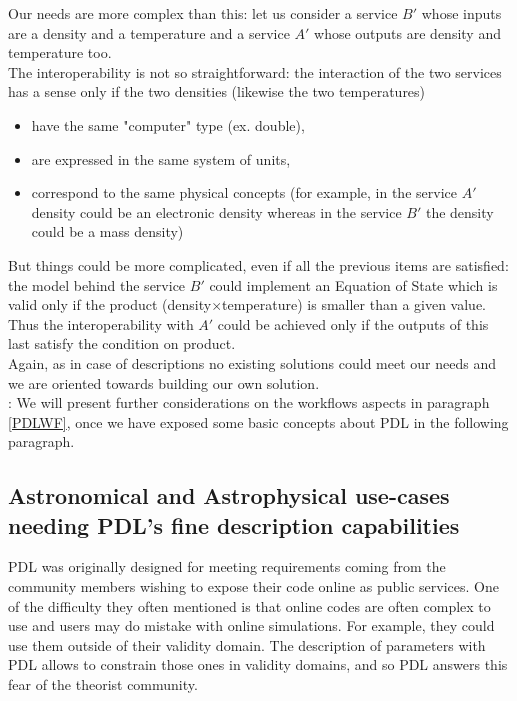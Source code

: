 \documentclass[a4paper,11pt] {ivoa}
\begin{document}
Our needs are more complex than this: let us consider a service $B'$ whose inputs are a density and
a temperature and a service $A'$ whose outputs are density and temperature too. \\
The interoperability is not so straightforward: the interaction of the two services has a sense only
if the two densities (likewise the two temperatures)
\begin{itemize}
\item have the same "computer" type (ex. double),
\item are expressed in the same system of units,
\item correspond to the same physical concepts (for example, in the service $A'$ density could be
an electronic density whereas in the service $B'$ the density could be a mass density)
\end{itemize}
But things could be more complicated, even if all the previous items are satisfied: the model behind
the service $B'$ could implement an Equation of State which is valid only if the product
(density$\times$temperature) is smaller than a given value.
Thus the interoperability with $A'$ could be achieved only if the outputs of this last satisfy the
condition on product.\\

Again, as in case of descriptions no existing solutions could meet our needs and we are oriented
towards building our own solution.\\

: We will present further considerations on the workflows aspects in paragraph \ref{PDLWF}, once we have exposed some basic concepts about PDL in the following paragraph.  

\subsection{Astronomical and Astrophysical use-cases needing PDL's fine description capabilities}
PDL was originally designed for meeting requirements coming from the community members wishing to expose their code online as public services. One of the difficulty they often mentioned is that online codes are often complex to use and users may do mistake with online simulations. For example, they could use them outside of their validity domain. The description of parameters with PDL allows to constrain those ones in validity domains, and so PDL answers this fear of the theorist community.\\
\end{document}
